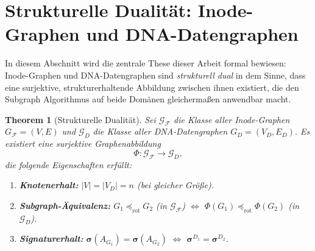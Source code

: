 ﻿\documentclass[a4paper,12pt]{article}
\theoremstyle{definition}
\theoremstyle{plain}
\newtheorem{theorem}{Theorem}[section]
\begin{document}
\section{Strukturelle Dualität: Inode-Graphen und DNA-Datengraphen}
\label{sec:dualitaet}

In diesem Abschnitt wird die zentrale These dieser Arbeit formal bewiesen:
Inode-Graphen und DNA-Datengraphen sind \emph{strukturell dual} in dem Sinne,
dass eine surjektive, strukturerhaltende Abbildung zwischen ihnen existiert,
die den Subgraph Algorithmus auf beide Domänen gleichermaßen anwendbar macht.

\begin{theorem}[Strukturelle Dualität]
\label{thm:dualitaet}
  Sei $\mathcal{G}_\mathcal{F}$ die Klasse aller Inode-Graphen
  $G_\mathcal{F} = (V, E)$ und $\mathcal{G}_D$ die Klasse aller
  DNA-Datengraphen $G_D = (V_D, E_D)$.
  Es existiert eine surjektive Graphenabbildung
  \[
    \Phi: \mathcal{G}_\mathcal{F} \longrightarrow \mathcal{G}_D,
  \]
  die folgende Eigenschaften erfüllt:
  \begin{enumerate}
    \item \textbf{Knotenerhalt:} $|V| = |V_D| = n$ (bei gleicher Größe).
    \item \textbf{Subgraph-Äquivalenz:}
          $G_1 \preceq_{\mathrm{rot}} G_2$ (in $\mathcal{G}_\mathcal{F}$)
          $\Longleftrightarrow$
          $\Phi(G_1) \preceq_{\mathrm{rot}} \Phi(G_2)$
          (in $\mathcal{G}_D$).
    \item \textbf{Signaturerhalt:}
          $\boldsymbol{\sigma}(A_{G_1}) = \boldsymbol{\sigma}(A_{G_2})$
          $\Longleftrightarrow$
          $\boldsymbol{\sigma}^{D_1} = \boldsymbol{\sigma}^{D_2}$.
  \end{enumerate}
\end{theorem}
\end{document}
